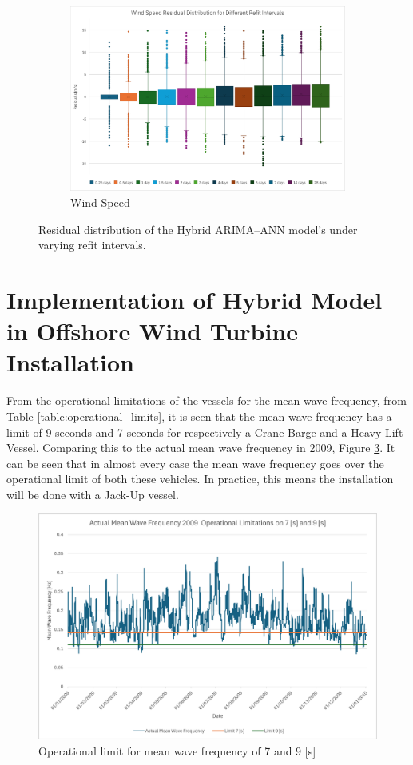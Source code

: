 \begin{figure}[ht!]
\begin{subfigure}[b]{0.49\textwidth}
        \includegraphics[width=\textwidth]{graphs/Box_refit_windspeed.png}
        \caption{Wind Speed}
        \label{fig:wind_speed_refit_box}
    \end{subfigure}
    \caption{Residual distribution of the Hybrid ARIMA–ANN model’s under varying refit intervals.}
    \label{fig:hybrid_refit_box}
\end{figure}

\newpage

\section{Implementation of Hybrid Model in Offshore Wind Turbine Installation}
\label{implementation_results}
From the operational limitations of the vessels for the mean wave frequency, from Table \ref{table:operational_limits}, it is seen that the mean wave frequency has a limit of 9 seconds and 7 seconds for respectively a Crane Barge and a Heavy Lift Vessel. Comparing this to the actual mean wave frequency in 2009, Figure \ref{fig:jack-up vessel usage}. It can be seen that in almost every case the mean wave frequency goes over the operational limit of both these vehicles. In practice, this means the installation will be done with a Jack-Up vessel.\\

\begin{figure}[ht!]
    \centering
    \includegraphics[width=0.6\linewidth]{graphs/Limitation on usage other ships then jack-up vessel.png}
    \caption{Operational limit for mean wave frequency of 7 and 9 [s]}
    \label{fig:jack-up vessel usage}
\end{figure}


